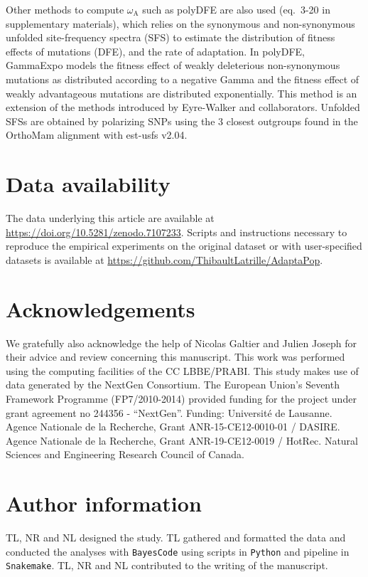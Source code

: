 \documentclass{article}
\newcommand{\rateApop}{\omega_{\mathrm{A}}}
\providecommand{\DIFaddbegin}{} %
\providecommand{\DIFaddend}{} %
\providecommand{\DIFdelbegin}{} %
\providecommand{\DIFdelend}{} %
\newcommand{\DIFscaledelfig}{0.5}
\newlength{\DIFdelgraphicswidth} %
\newlength{\DIFdelgraphicsheight} %
\newcommand{\DIFaddincludegraphics}[2][]{{\color{blue}\fbox{\DIFOincludegraphics[#1]{#2}}}} %
\newcommand{\DIFdelincludegraphics}[2][]{%
\sbox{\DIFdelgraphicsbox}{\DIFOincludegraphics[#1]{#2}}%
\settoboxwidth{\DIFdelgraphicswidth}{\DIFdelgraphicsbox} %
\settoboxtotalheight{\DIFdelgraphicsheight}{\DIFdelgraphicsbox} %
\scalebox{\DIFscaledelfig}{%
\parbox[b]{\DIFdelgraphicswidth}{\usebox{\DIFdelgraphicsbox}\\[-\baselineskip] \rule{\DIFdelgraphicswidth}{0em}}\llap{\resizebox{\DIFdelgraphicswidth}{\DIFdelgraphicsheight}{%
\setlength{\unitlength}{\DIFdelgraphicswidth}%
\begin{picture}(1,1)%
\thicklines\linethickness{2pt} %
{\color[rgb]{1,0,0}\put(0,0){\framebox(1,1){}}}%
{\color[rgb]{1,0,0}\put(0,0){\line( 1,1){1}}}%
{\color[rgb]{1,0,0}\put(0,1){\line(1,-1){1}}}%
\end{picture}%
}\hspace*{3pt}}} %
} %
\DeclareRobustCommand{\DIFaddbegin}{\DIFOaddbegin \let\includegraphics\DIFaddincludegraphics} %
\DeclareRobustCommand{\DIFaddend}{\DIFOaddend \let\includegraphics\DIFOincludegraphics} %
\DeclareRobustCommand{\DIFdelbegin}{\DIFOdelbegin \let\includegraphics\DIFdelincludegraphics} %
\DeclareRobustCommand{\DIFdelend}{\DIFOaddend \let\includegraphics\DIFOincludegraphics} %
\begin{document}
    Other methods to compute $\rateApop$ such as polyDFE\cite{tataru_polydfe_2020} are also used (eq.~3-20 in supplementary materials), which relies on the synonymous and non-synonymous unfolded site-frequency spectra (SFS) to estimate the distribution of fitness effects of mutations (DFE), and the rate of adaptation.
    In polyDFE, GammaExpo models the fitness effect of weakly deleterious non-synonymous mutations as distributed according to a negative Gamma and the fitness effect of weakly advantageous mutations are distributed exponentially.
    This method is an extension of the methods introduced by Eyre-Walker and collaborators\cite{eyre-walker_distribution_2006, eyre-walker_estimating_2009}.
    Unfolded SFSs are obtained by polarizing SNPs using the $3$ closest outgroups found in the OrthoMam alignment with est-usfs v2.04\cite{keightley_inferring_2018}.

    \section{Data availability}\label{sec:data-availability}
    The data underlying this article are available at \DIFdelbegin %
\DIFdelend \DIFaddbegin \url{https://doi.org/10.5281/zenodo.7107233}\DIFaddend .
    Scripts and instructions necessary to reproduce the empirical experiments on the original dataset or with user-specified datasets is available at \url{https://github.com/ThibaultLatrille/AdaptaPop}.

    \section{Acknowledgements}\label{sec:acknowledgements}
    We gratefully also acknowledge the help of Nicolas Galtier and Julien Joseph for their advice and review concerning this manuscript.
    This work was performed using the computing facilities of the CC LBBE/PRABI.
    This study makes use of data generated by the NextGen Consortium.
    The European Union’s Seventh Framework Programme (FP7/2010-2014) provided funding for the project under grant agreement no 244356 - “NextGen”.
    Funding: Université de Lausanne.
    Agence Nationale de la Recherche, Grant ANR-15-CE12-0010-01 / DASIRE.
    Agence Nationale de la Recherche, Grant ANR-19-CE12-0019 / HotRec.
    Natural Sciences and Engineering Research Council of Canada.

    \section{Author information}\label{sec:author-information}
    TL, NR and NL designed the study.
    TL gathered and formatted the data and conducted the analyses with \texttt{BayesCode} using scripts in \texttt{Python} and pipeline in \texttt{Snakemake}.
    TL, NR and NL contributed to the writing of the manuscript.
\end{document}
